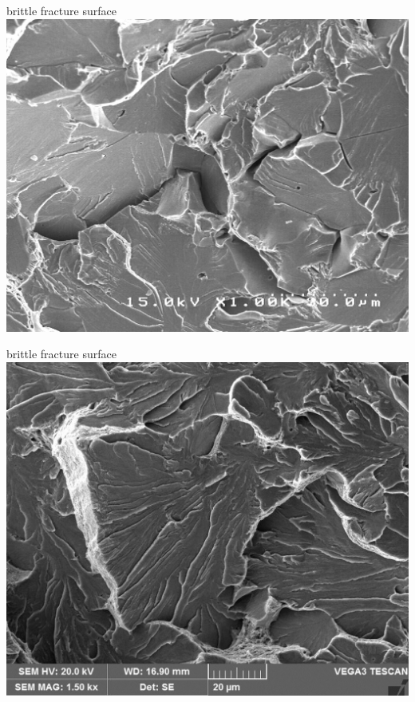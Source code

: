 \documentclass[
  letterpaper,
  ignorenonframetext,
  aspectratio=43,
  handout,
  12pt]{beamer}
\let\Oldincludegraphics\includegraphics
\renewcommand{\includegraphics}[2][]{\Oldincludegraphics[width=\textwidth,height=0.7\textheight,keepaspectratio]{#2}}
\begin{document}
\begin{frame}{brittle fracture surface}
\protect\hypertarget{brittle-fracture-surface}{}
\includegraphics{../images/brittle1.jpg}
\end{frame}

\begin{frame}{brittle fracture surface}
\protect\hypertarget{brittle-fracture-surface-1}{}
\includegraphics{../images/brittle2.jpg}
\end{frame}
\end{document}
